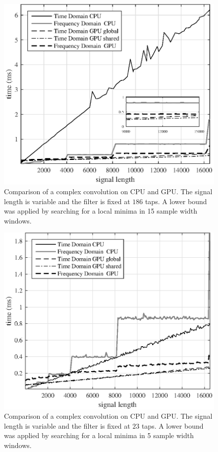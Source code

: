 \begin{figure}
	\centering\includegraphics[width=5in]{figures/gpu_intro/CPUvsGPU_1batch_186taps_varySignal.eps}
	\caption{Comparison of a complex convolution on CPU and GPU. The signal length is variable and the filter is fixed at $186$ taps. A lower bound was applied by searching for a local minima in 15 sample width windows.}
	\label{fig:CPUvsGPU_1batch_186taps_varySignal}
\end{figure}
\begin{figure}
	\centering\includegraphics[width=5in]{figures/gpu_intro/CPUvsGPU_1batch_23taps_varySignal.eps}
	\caption{Comparison of a complex convolution on CPU and GPU. The signal length is variable and the filter is fixed at $23$ taps. A lower bound was applied by searching for a local minima in 5 sample width windows.}
	\label{fig:CPUvsGPU_1batch_23taps_varySignal}
\end{figure}
